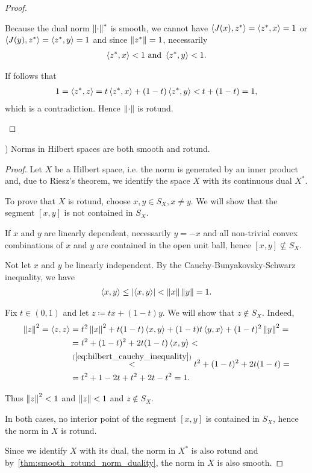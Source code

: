 \begin{proof}
\begin{enumerate}
    Because the dual norm $\left\Vert \cdot \right\Vert^*$ is smooth, we cannot have $\left\langle J(x), z^* \right\rangle =  \left\langle z^*, x \right\rangle = 1$ or $\left\langle J(y), z^* \right\rangle = \left\langle z^*, y \right\rangle = 1$ and since $\left\Vert z^* \right\Vert = 1$, necessarily
    \begin{align*}
      \left\langle z^*, x \right\rangle < 1 \text{ and } \left\langle z^*, y \right\rangle < 1.
    \end{align*}

    If follows that
    \begin{align*}
      1
      =
      \left\langle z^*, z \right\rangle
      =
      t \left\langle z^*, x \right\rangle + (1-t) \left\langle z^*, y \right\rangle
      <
      t + (1-t)
      =
      1,
    \end{align*}
    which is a contradiction. Hence $\left\Vert \cdot \right\Vert$ is rotund.
  \end{enumerate}
\end{proof}

\begin{proposition}\label{thm:hilbert_space_smooth_rotund}\cite[exercise 2.37(c]{Phelps1993})
  Norms in Hilbert spaces are both smooth and rotund.
\end{proposition}
\begin{proof}
  Let $X$ be a Hilbert space, i.e. the norm is generated by an inner product and, due to Riesz's theorem, we identify the space $X$ with its continuous dual $X^*$.

  To prove that $X$ is rotund, choose $x, y \in S_X, x \neq y$. We will show that the segment $[x, y]$ is not contained in $S_X$.

  If $x$ and $y$ are linearly dependent, necessarily $y = -x$ and all non-trivial convex combinations of $x$ and $y$ are contained in the open unit ball, hence $[x, y] \not\subseteq S_X$.

  Not let $x$ and $y$ be linearly independent. By the Cauchy-Bunyakovsky-Schwarz inequality, we have
  \begin{align}\label{eq:hilbert_cauchy_inequality}
    \left\langle x, y \right\rangle \leq \left\vert \left\langle x, y \right\rangle \right\vert < \left\Vert x \right\Vert \left\Vert y \right\Vert = 1.
  \end{align}

  Fix $t \in (0, 1)$ and let $z \coloneqq tx + (1-t)y$. We will show that $z \not\in S_X$. Indeed,
  \begin{align*}
    \left\Vert z \right\Vert^2
    =
    \left\langle z, z \right\rangle
    &=
    t^2 \left\Vert x \right\Vert^2 + t(1-t) \left\langle x, y \right\rangle + (1-t) t \left\langle y, x \right\rangle + (1-t)^2 \left\Vert y \right\Vert^2
    = \\ &=
    t^2 + (1-t)^2 + 2 t(1-t) \left\langle x, y \right\rangle
    < \\ &\overset {(\ref{eq:hilbert_cauchy_inequality})} <
    t^2 + (1-t)^2 + 2 t(1-t)
    = \\ &=
    t^2 + 1 - 2t + t^2 + 2t - t^2
    =
    1.
  \end{align*}

  Thus $\left\Vert z \right\Vert^2 < 1$ and $\left\Vert z \right\Vert < 1$ and $z \not\in S_X$.

  In both cases, no interior point of the segment $[x, y]$ is contained in $S_X$, hence the norm in $X$ is rotund.

  Since we identify $X$ with its dual, the norm in $X^*$ is also rotund and by~\cref{thm:smooth_rotund_norm_duality}, the norm in $X$ is also smooth.
\end{proof}

